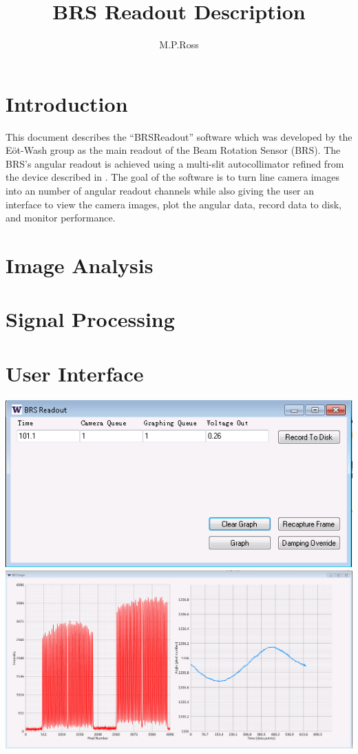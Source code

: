 \documentclass{article}
\title{BRS Readout Description}
\author{M.P.Ross}
\begin{document}
\maketitle
\section{Introduction}
This document describes the ``BRSReadout'' software which was developed by the E{\"o}t-Wash group as the main readout of the Beam Rotation Sensor (BRS). The BRS's angular readout is achieved using a multi-slit autocollimator refined from the device described in \cite{autoCol}. The goal of the software is to turn line camera images into an number of angular readout channels while also giving the user an interface to view the camera images, plot the angular data, record data to disk, and monitor performance.
\section{Image Analysis}

\section{Signal Processing}
\section{User Interface}

\includegraphics[width=\textwidth]{BRSReadoutScreen.png}\\
\includegraphics[width=\textwidth]{BRSReadoutScreenGraph.png}


{}
\end{document}

